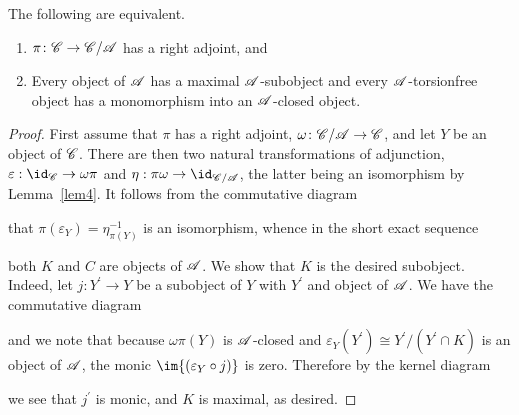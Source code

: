 \documentclass[10pt]{amsart}
\begin{document}
\begin{thm}\label{thm1}
  The following are equivalent.
  \begin{enumerate}
  \item
    $\pi \colon \mathscr{C} \rightarrow \mathscr{C}/\mathscr{A}$ has a right adjoint, and
  \item
    Every object of $\mathscr{A}$ has a maximal $\mathscr{A}$-subobject and every $\mathscr{A}$-torsionfree object has a monomorphism into an $\mathscr{A}$-closed object.
  \end{enumerate}

  \begin{proof}
    First assume that $\pi$ has a right adjoint, $\omega \colon \mathscr{C}/\mathscr{A} \rightarrow \mathscr{C}$, and let $Y$ be an object of $\mathscr{C}$.
    There are then two natural transformations of adjunction, $\varepsilon : \id_\C \rightarrow \omega\pi$ and $\eta : \pi\omega \rightarrow \id_{\C/\A}$, the latter being an isomorphism by Lemma~\ref{lem4}.
    It follows from the commutative diagram
    \begin{center}
    \end{center}
    that $\pi(\varepsilon_Y) = \eta_{\pi(Y)}^{-1}$ is an isomorphism, whence in the short exact sequence    
    \begin{center}
    \end{center}
    both $K$ and $C$ are objects of $\mathscr{A}$.
    We show that $K$ is the desired subobject.
    Indeed, let $j \colon Y^\prime \rightarrow Y$ be a subobject of $Y$ with $Y^\prime$ and object of $\mathscr{A}$.
    We have the commutative diagram
    \begin{center}
    \end{center}
    and we note that because $\omega\pi(Y)$ is $\mathscr{A}$-closed and $\varepsilon_Y(Y^\prime) \cong Y^\prime/\left(Y^\prime \cap K\right)$ is an object of $\mathscr{A}$, the monic $\im{(\varepsilon_Y \circ j)}$ is zero.
    Therefore by the kernel diagram
    \begin{center}
    \end{center}
    we see that $j^\prime$ is monic, and $K$ is maximal, as desired. 
    

\end{proof}
\end{thm}
\end{document}

